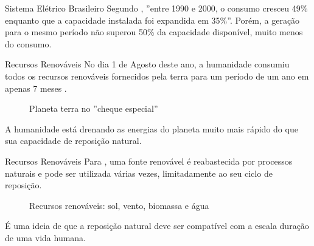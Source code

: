 \documentclass[aspectraio=169,8pt,slidestop,xcolor=table]{beamer}
\newcommand{\fonte}[1]{{\resizebox{!}{5pt}{Fonte: #1}}}
\begin{document}



\begin{frame}{Sistema Elétrico Brasileiro}
Segundo , ''entre 1990 e 2000, o consumo cresceu 49\% enquanto que a capacidade instalada foi expandida em 35\%''. Porém, a geração para o mesmo período não superou 50\% da capacidade disponível, muito menos do consumo.



\end{frame}

\begin{frame}{Recursos Renováveis}
No dia 1 de Agosto deste ano, a humanidade consumiu todos os recursos renováveis fornecidos pela terra para um período de um ano em apenas 7 meses \cite{exame}.

\begin{figure}[!h]
    \centering
    \caption{Planeta terra no ''cheque especial''}
\end{figure}

A humanidade está drenando as energias do planeta muito mais rápido do que sua capacidade de reposição natural.

\end{frame}

\begin{frame}{Recursos Renováveis}
Para , uma fonte renovável é reabastecida por processos naturais e pode ser utilizada várias vezes, limitadamente ao seu ciclo de reposição.

\begin{figure}[!h]
    \centering
    \caption{Recursos renováveis: sol, vento, biomassa e água}
    \label{renovaveis}
    \fonte{O autor}
\end{figure}

É uma ideia de que a reposição natural deve ser compatível com a escala duração de uma vida humana.

\end{frame}
\end{document}
